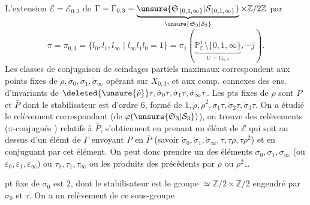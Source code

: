 L'extension $\mathcal E=\mathcal E_{0,3}$ de $\Gamma=\Gamma_{0,3}=\underbrace{\unsure{\mathfrak S_{\{0,1,\infty\}}|\mathcal S_{\{0,1,\infty\}}}}_{\unsure{\mathfrak S_3|\mathcal S_3}}\times\mathbb Z/2\mathbb Z$
par
\[
\pi=\pi_{0,3}=\{l_0,l_1,l_\infty\mid l_\infty l_1l_0=1\}=\pi_1(\underbrace{\mathbb P^1_{\mathbb C}\setminus\{0,1,\infty\}}_{U=U_{0,3}},-\bar j).
\]
Les classes de conjugaison  de scindages partiels maximaux correspondent aux points fixes de $\dot\rho,\dot\sigma_0,\dot\sigma_1,\dot\sigma_\infty$ opérant sur $X_{0,3}$, et  aux comp. connexes des ens. d'invariants de $\deleted{\unsure{\dot\rho}}\tau,\dot\sigma_0\tau,\dot\sigma_1\tau,\dot\sigma_\infty\tau$. Les pts fixes de $\rho$ sont $P$ et $\bar P$ dont le stabilisateur est d'ordre $6$,  formé de $1,\dot\rho,\dot\rho^2,\dot\sigma_1\tau,\dot\sigma_2\tau,\dot\sigma_3\tau$. On a étudié le relèvement correspondant  (de $\varphi(\unsure{\mathfrak S_3|\mathcal S_3})$), on trouve des relèvements ($\pi$-conjugués ) relatifs à $\bar P$, s'obtiennent en  prenant un élémt de $\mathcal E$  qui soit au dessus d'un élémt de $\Gamma$ envoyant $P$ en $\bar P$ (savoir $\dot\sigma_0,\dot\sigma_1,\dot\sigma_\infty,\tau,\tau\rho,\tau\rho^2$) et en conjuguant par cet élément. On peut donc prendre  un des éléments $\sigma_0,\sigma_1,\sigma_\infty$ (ou $\varepsilon_0,\varepsilon_1,\varepsilon_\infty$) ou $\tau_0,\tau_1,\tau_\infty$ ou les produits des précédents par \deleted{\unsure{$\tau$}} $\rho$ ou $\rho^2$\ldots

  pt fixe de $\sigma_0$ est $2$, dont le stabilisateur est le groupe $\simeq\mathbb Z/2\times\mathbb Z/2$ engendré par $\sigma_0$ et $\tau$. On a un relèvement de ce sous-groupe

